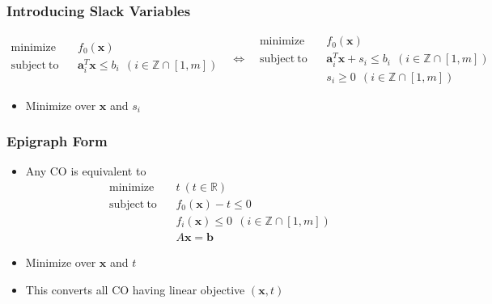 \subsubsection*{Introducing Slack Variables}
\vspace*{-\baselineskip}
\begin{equation}\begin{aligned}
    \mathrm{minimize}~~&~~f_0(\mathbf{x}) \\
    \mathrm{subject~to}~~&~~\mathbf{a}_i^T \mathbf{x} \leq b_i~~(i \in \mathbb{Z} \cap [1,m]) \\ {}
\end{aligned}~~~\Leftrightarrow~~~\begin{aligned}
    \mathrm{minimize}~~&~~f_0(\mathbf{x}) \\
    \mathrm{subject~to}~~&~~\mathbf{a}_i^T \mathbf{x} + s_i \leq b_i~~(i \in \mathbb{Z} \cap [1,m]) \\
        &~~ s_i \geq 0~~(i \in \mathbb{Z} \cap [1,m])
\end{aligned}\end{equation}
\begin{itemize}
    \item Minimize over $\mathbf{x}$ and $s_i$
\end{itemize}

\subsubsection*{Epigraph Form}
\begin{itemize}
    \item Any CO is equivalent to
    \begin{equation}\begin{aligned}
        \mathrm{minimize}~~&~~t~(t \in \mathbb{R}) \\
        \mathrm{subject~to}~~&~~f_0(\mathbf{x}) - t \leq 0 \\
            &~~f_i(\mathbf{x}) \leq 0~~(i \in \mathbb{Z} \cap [1,m]) \\
            &~~ A\mathbf{x} = \mathbf{b}
    \end{aligned}\end{equation}
    \item Minimize over $\mathbf{x}$ and $t$
    \item This converts all CO having linear objective $(\mathbf{x}, t)$
\end{itemize}

